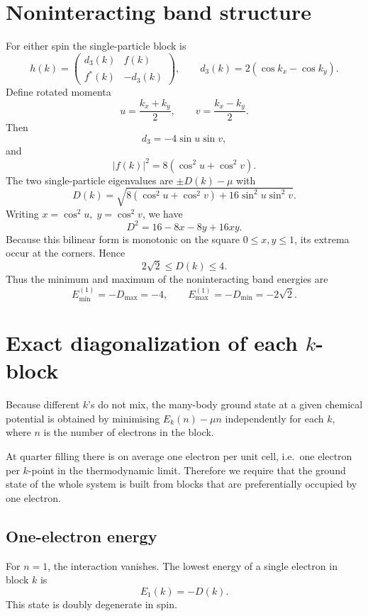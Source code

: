 \documentclass[11pt,a4paper]{article}
\begin{document}
\section{Noninteracting band structure}

For either spin the single-particle block is
\begin{equation}
h(k) =
\begin{pmatrix}
d_3(k) & f(k)\\
f^*(k) & -d_3(k)
\end{pmatrix},
\qquad
d_3(k) = 2(\cos k_x-\cos k_y).
\end{equation}
Define rotated momenta
\[
u=\frac{k_x+k_y}{2},\qquad v=\frac{k_x-k_y}{2}.
\]
Then
\[
d_3 = -4\sin u\sin v,
\]
and
\[
|f(k)|^2 = 8(\cos^2 u+\cos^2 v).
\]
The two single-particle eigenvalues are \(\pm D(k)-\mu\) with
\begin{equation}
D(k) = \sqrt{8(\cos^2 u+\cos^2 v)+16\sin^2 u\sin^2 v}.
\end{equation}
Writing \(x=\cos^2 u,\; y=\cos^2 v\), we have
\[
D^2 = 16 - 8x - 8y + 16xy.
\]
Because this bilinear form is monotonic on the square \(0\le x,y\le1\), its extrema occur at the corners. Hence
\[
2\sqrt2 \le D(k) \le 4.
\]
Thus the minimum and maximum of the noninteracting band energies are
\[
E_{\min}^{(1)} = -D_{\max} = -4,
\qquad
E_{\max}^{(1)} = -D_{\min} = -2\sqrt2.
\]

\section{Exact diagonalization of each \(k\)-block}

Because different \(k\)'s do not mix, the many-body ground state at a given chemical potential is obtained by minimising \(E_k(n)-\mu n\) independently for each \(k\), where \(n\) is the number of electrons in the block.

At quarter filling there is on average one electron per unit cell, i.e.\ one electron per \(k\)-point in the thermodynamic limit. Therefore we require that the ground state of the whole system is built from blocks that are preferentially occupied by one electron.

\subsection{One-electron energy}

For \(n=1\), the interaction vanishes. The lowest energy of a single electron in block \(k\) is
\begin{equation}
E_1(k) = -D(k).
\end{equation}
This state is doubly degenerate in spin.
\end{document}

